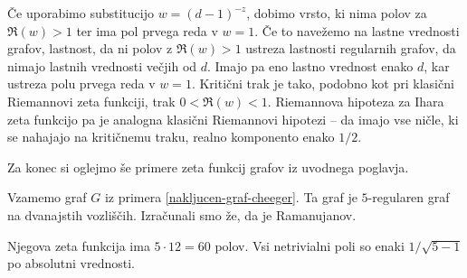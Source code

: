 Če uporabimo substitucijo \(w = (d-1)^{-z}\), dobimo vrsto, ki nima polov za \(\Re(w)>1\) ter ima pol prvega reda v \(w=1\). Če to navežemo na lastne vrednosti grafov, lastnost, da ni polov z \(\Re(w)>1\) ustreza lastnosti regularnih grafov, da nimajo lastnih vrednosti večjih od \(d\). Imajo pa eno lastno vrednost enako \(d\), kar ustreza polu prvega reda v \(w=1\). Kritični trak je tako, podobno kot pri klasični Riemannovi zeta funkciji, trak \(0<\Re(w)<1\). Riemannova hipoteza za Ihara zeta funkcijo pa je analogna klasični Riemannovi hipotezi -- da imajo vse ničle, ki se nahajajo na kritičnemu traku, realno komponento enako \(1/2\).

Za konec si oglejmo še primere zeta funkcij grafov iz uvodnega poglavja.

\begin{primer}
    Vzamemo graf \(G\) iz primera \ref{nakljucen-graf-cheeger}. Ta graf je \(5\)-regularen graf na dvanajstih vozliščih. Izračunali smo že, da je Ramanujanov.

    Njegova zeta funkcija ima \(5\cdot 12 = 60\) polov. Vsi netrivialni poli so enaki \(1/\sqrt{5-1}\) po absolutni vrednosti.

    \begin{figure}[t]
        \centering

\end{figure}
\end{primer}
